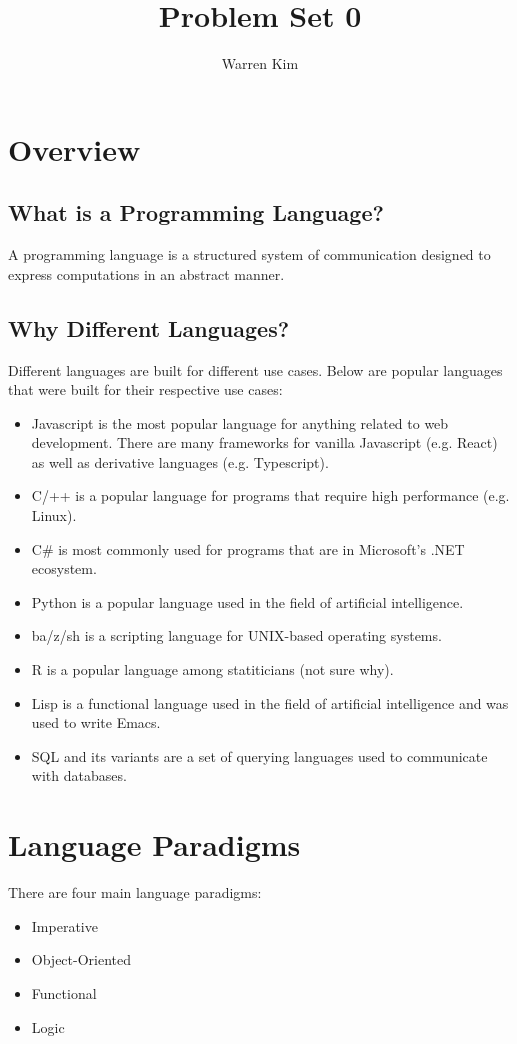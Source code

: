 \documentclass[13pt]{article}
\title{Problem Set 0}
\author{Warren Kim}
\begin{document}
\maketitle

\tableofcontents

\newpage
\section{Overview}
\subsection{What is a Programming Language?}
A programming language is a structured system of communication designed to express computations in an 
abstract manner.

\subsection{Why Different Languages?}
Different languages are built for different use cases. Below are popular languages that were built for
their respective use cases:
\begin{itemize}[label=,leftmargin=*]
\item Javascript is the most popular language for anything related to web development. There are many
  frameworks for vanilla Javascript (e.g. React) as well as derivative languages (e.g. Typescript).
\item C/++ is a popular language for programs that require high performance (e.g. Linux).
\item C# is most commonly used for programs that are in Microsoft's .NET ecosystem.
\item Python is a popular language used in the field of artificial intelligence.
\item ba/z/sh is a scripting language for UNIX-based operating systems.
\item R is a popular language among statiticians (not sure why).
\item Lisp is a functional language used in the field of artificial intelligence and was used to 
  write Emacs.
\item SQL and its variants are a set of querying languages used to communicate with databases.
\end{itemize}

\section{Language Paradigms}
There are four main language paradigms:
\begin{itemize}[label=,leftmargin=*]
\item Imperative
\item Object-Oriented
\item Functional
\item Logic
\end{itemize}
\end{document}
